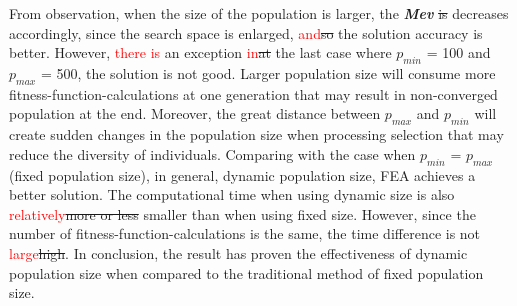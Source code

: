 \documentclass[final]{elsarticle}
\begin{document}
From observation, when the size of the population is larger, the \textit{\textbf{Mev}} \sout{is} decreases accordingly, since the search space is enlarged, \textcolor{red}{and}\sout{so} the solution accuracy is better. However, \textcolor{red}{there is} an exception \textcolor{red}{in}\sout{at} the last case where $p_{min}$ = 100 and $p_{max}$ = 500, the solution is not good. Larger population size will consume more fitness-function-calculations at one generation that may result in non-converged population at the end. Moreover, the great distance between \textbf{$p_{max}$} and $p_{min}$ will create sudden changes in the population size when processing selection that may reduce the diversity of individuals. Comparing with the case when $p_{min} $ = $ p_{max} $ (fixed population size), in general, dynamic population size, FEA achieves a better solution. The computational time when using dynamic size is also \textcolor{red}{relatively}\sout{more or less} smaller than when using fixed size. However, since the number of fitness-function-calculations is the same, the time difference is not \textcolor{red}{large}\sout{high}. In conclusion, the result has proven the effectiveness of dynamic population size when compared to the traditional method of fixed population size. 
%
\end{document}
